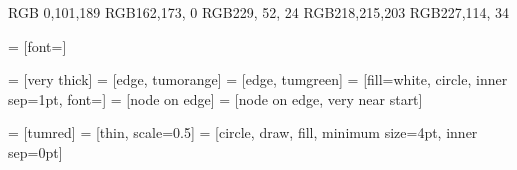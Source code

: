      {RGB}{  0,101,189}
    {RGB}{162,173,  0}
      {RGB}{229, 52, 24}
    {RGB}{218,215,203}
   {RGB}{227,114, 34}

 = [font=\normalsize]

 = [very thick]
 = [edge, tumorange]
 = [edge, tumgreen]
 = [fill=white, circle, inner sep=1pt, font=\small]
 = [node on edge]
 = [node on edge, very near start]

 = [tumred]
 = [thin, scale=0.5]
 = [circle, draw, fill, minimum size=4pt, inner sep=0pt]
